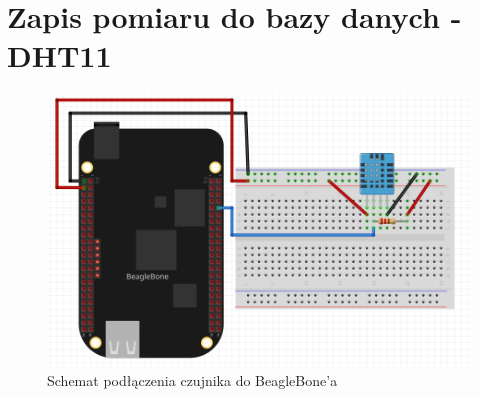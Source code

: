 \documentclass[polish,a4paper]{article}
\begin{document}
	\section{Zapis pomiaru do bazy danych - DHT11}
	\begin{figure}[h!]
		\begin{center}
			\includegraphics[scale=0.7]{dht11.png}
			\caption*{Schemat podłączenia czujnika do BeagleBone'a}
		\end{center}
	\end{figure}
 \newpage
\end{document}
